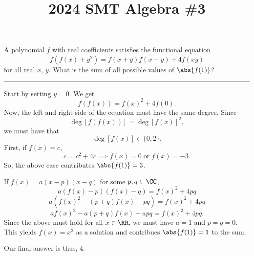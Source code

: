 \documentclass[12pt]{scrartcl}
\title{2024 SMT Algebra \#3}
\begin{document}
\begin{mdframed}[style=mdpurplebox,frametitle={Problem Statement}]
    A polynomial $f$ with real coefficients satisfies the functional equation
    \[f(f(x) + y^{2}) = f(x + y)f(x - y) + 4f(xy)\]
    for all real $x$, $y$. What is the sum of all possible values of $\abs{f(1)}$?
\end{mdframed}

\vspace{-\baselineskip}\rule{\textwidth}{0.4pt}

Start by setting $y = 0$. We get
\[f(f(x)) = f(x)^{2} + 4f(0).\]
Now, the left and right side of the equation must have the same degree. Since
\[\deg[f(f(x))] = \deg[f(x)]^{2},\]
we must have that
\[\deg[f(x)] \in \{0, 2\}.\]
First, if $f(x) = c$,
\[c = c^{2} + 4c \implies f(x) = 0 \; \text{or} \; f(x) = -3.\]
So, the above case contributes $\abs{f(1)} = 3$.

If $f(x) = a(x - p)(x - q)$ for some $p, q \in \CC$,
\[a(f(x) - p)(f(x) - q) = f(x)^{2} + 4pq\]
\[a(f(x)^{2} - (p + q)f(x) + pq) = f(x)^{2} + 4pq\]
\[af(x)^{2} - a(p + q)f(x) + apq = f(x)^{2} + 4pq.\]
Since the above must hold for all $x \in \RR$, we must have $a = 1$ and $p = q = 0$. This yields $f(x) = x^{2}$ as a solution and contribues $\abs{f(1)} = 1$ to the sum.

Our final answer is thus, $\boxed{4}$.
\end{document}
